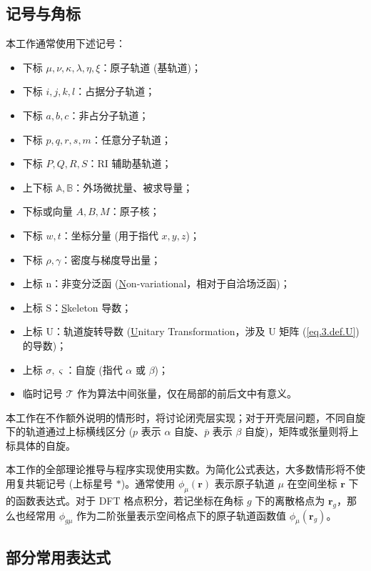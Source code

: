 \subsection{记号与角标}

本工作通常使用下述记号：
\begin{itemize}[nosep]
  \item 下标 $\mu, \nu, \kappa, \lambda, \eta, \xi$：原子轨道 (基轨道)；
  \item 下标 $i, j, k, l$：占据分子轨道；
  \item 下标 $a, b, c$：非占分子轨道；
  \item 下标 $p, q, r, s, m$：任意分子轨道；
  \item 下标 $P, Q, R, S$：RI 辅助基轨道；
  \item 上下标 $\mathbb{A}, \mathbb{B}$：外场微扰量、被求导量；
  \item 下标或向量 $A, B, M$：原子核；
  \item 下标 $w, t$：坐标分量 (用于指代 $x, y, z$)；
  \item 下标 $\rho, \gamma$：密度与梯度导出量；
  \item 上标 $\mathrm{n}$：非变分泛函 (\underline{N}on-variational，相对于自洽场泛函)；
  \item 上标 $\mathrm{S}$：\underline{S}keleton 导数；
  \item 上标 $\mathrm{U}$：轨道旋转导数 (\underline{U}nitary Transformation，涉及 U 矩阵 (\ref{eq.3.def.U}) 的导数)；
  \item 上标 $\sigma, \varsigma$：自旋 (指代 $\alpha$ 或 $\beta$)；
  \item 临时记号 $\mathscr{T}$ 作为算法中间张量，仅在局部的前后文中有意义。
\end{itemize}

本工作在不作额外说明的情形时，将讨论闭壳层实现；对于开壳层问题，不同自旋下的轨道通过上标横线区分 ($p$ 表示 $\alpha$ 自旋、$\bar p$ 表示 $\beta$ 自旋)，矩阵或张量则将上标具体的自旋。

本工作的全部理论推导与程序实现使用实数。为简化公式表达，大多数情形将不使用复共轭记号 (上标星号 $*$)。通常使用 $\phi_\mu (\bm{r})$ 表示原子轨道 $\mu$ 在空间坐标 $\bm{r}$ 下的函数表达式。对于 DFT 格点积分，若记坐标在角标 $g$ 下的离散格点为 $\bm{r}_g$，那么也经常用 $\phi_{g \mu}$ 作为二阶张量表示空间格点下的原子轨道函数值 $\phi_\mu (\bm{r}_g)$。

\subsection{部分常用表达式}

